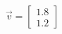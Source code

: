 \documentclass[preview]{standalone}
\begin{document}
\begin{align*}
\vec{v}=\begin{bmatrix}1.8\\1.2\end{bmatrix}
\end{align*}
\end{document}
